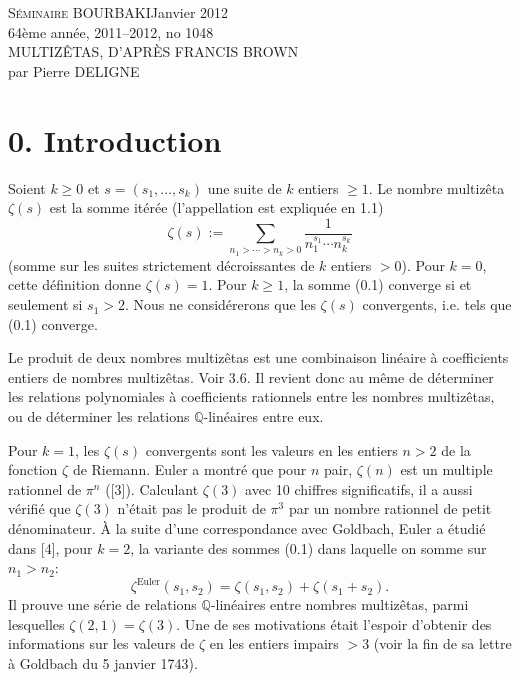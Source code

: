 \documentclass[11pt,a4paper]{article}
\theoremstyle{plain}
\theoremstyle{definition}
\newcommand{\Q}{\mathbb{Q}}
\begin{document}
\begin{center}
\textsc{S\'eminaire BOURBAKI}\hfill Janvier 2012\\
64\`eme ann\'ee, 2011--2012, no 1048\\[1em]
{\Large MULTIZ\^ETAS, D'APR\`ES FRANCIS BROWN}\\[.5em]
par Pierre DELIGNE
\end{center}

\section*{0. Introduction}

Soient $k \geq 0$ et $s = (s_1,\ldots,s_k)$ une suite de $k$ entiers $\geq 1$. Le nombre multiz\^eta $\zeta(s)$ est la somme it\'er\'ee (l'appellation est expliqu\'ee en 1.1)
\begin{equation}\label{eq:0.1}
\zeta(s) := \sum_{n_1 > \cdots > n_k > 0} \frac{1}{n_1^{s_1} \cdots n_k^{s_k}}
\end{equation}
(somme sur les suites strictement d\'ecroissantes de $k$ entiers $> 0$). Pour $k = 0$, cette d\'efinition donne $\zeta(s) = 1$. Pour $k \geq 1$, la somme (0.1) converge si et seulement si $s_1 > 2$. Nous ne consid\'ererons que les $\zeta(s)$ convergents, i.e. tels que (0.1) converge.

Le produit de deux nombres multiz\^etas est une combinaison lin\'eaire \`a coefficients entiers de nombres multiz\^etas. Voir 3.6. Il revient donc au m\^eme de d\'eterminer les relations polynomiales \`a coefficients rationnels entre les nombres multiz\^etas, ou de d\'eterminer les relations $\Q$-lin\'eaires entre eux.

Pour $k = 1$, les $\zeta(s)$ convergents sont les valeurs en les entiers $n > 2$ de la fonction $\zeta$ de Riemann. Euler a montr\'e que pour $n$ pair, $\zeta(n)$ est un multiple rationnel de $\pi^n$ ([3]). Calculant $\zeta(3)$ avec 10 chiffres significatifs, il a aussi v\'erifi\'e que $\zeta(3)$ n'\'etait pas le produit de $\pi^3$ par un nombre rationnel de petit d\'enominateur. \`A la suite d'une correspondance avec Goldbach, Euler a \'etudi\'e dans [4], pour $k = 2$, la variante des sommes (0.1) dans laquelle on somme sur $n_1 > n_2$:
\[
\zeta^{\text{Euler}}(s_1,s_2) = \zeta(s_1,s_2) + \zeta(s_1+s_2).
\]
Il prouve une s\'erie de relations $\Q$-lin\'eaires entre nombres multiz\^etas, parmi lesquelles $\zeta(2,1) = \zeta(3)$. Une de ses motivations \'etait l'espoir d'obtenir des informations sur les valeurs de $\zeta$ en les entiers impairs $> 3$ (voir la fin de sa lettre \`a Goldbach du 5 janvier 1743).
\end{document}
